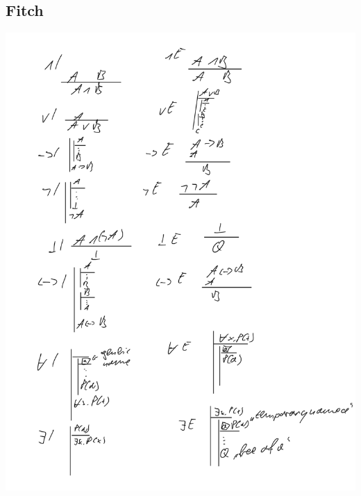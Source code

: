 \documentclass[a4paper]{article}
\begin{document}
		\subsection{Fitch}
			\includegraphics[scale=0.3]{IMG_0800.PNG}
\end{document}
